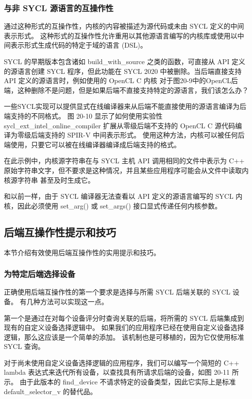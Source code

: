 \subsubsection{与非 SYCL 源语言的互操作性}
通过这种形式的互操作性，内核的内容被描述为源代码或未由 SYCL 定义的中间表示形式。 这种形式的互操作性允许重用以其他源语言编写的内核库或使用以中间表示形式生成代码的特定于域的语言 (DSL)。

SYCL 的早期版本包含诸如 build\_with\_source 之类的函数，可直接从 API 定义的源语言创建 SYCL 程序，但此功能在 SYCL 2020 中被删除。当后端直接支持 API 定义的源语言时，例如使用的 OpenCL C 内核 对于图20-9中的OpenCL后端，这种删除不是问题，但是如果后端不直接支持特定的源语言，我们该怎么办？

一些SYCL实现可以提供显式在线编译器来从后端不能直接使用的源语言编译为后端支持的不同格式。 图 20-10 显示了如何使用实验性 sycl\_ext\_intel\_online\_compiler 扩展从零级后端不支持的 OpenCL C 源代码编译为零级后端支持的 SPIR-V 中间表示形式。 使用这种方法，内核可以被任何后端使用，只要它可以被在线编译器编译成后端支持的格式。

在此示例中，内核源字符串在与 SYCL 主机 API 调用相同的文件中表示为 C++ 原始字符串文字，但不要求是这种情况，并且某些应用程序可能会从文件中读取内核源字符串 甚至及时生成它。

和以前一样，由于 SYCL 编译器无法查看以 API 定义的源语言编写的 SYCL 内核，因此必须使用 set\_arg() 或 set\_args() 接口显式传递任何内核参数。

\subsection{后端互操作性提示和技巧}
本节介绍有效使用后端互操作性的实用提示和技巧。

\subsubsection{为特定后端选择设备}
正确使用后端互操作性的第一个要求是选择与所需 SYCL 后端关联的 SYCL 设备。 有几种方法可以实现这一点。

第一个是通过在对每个设备评分时查询关联的后端，将所需的 SYCL 后端集成到现有的自定义设备选择逻辑中。 如果我们的应用程序已经在使用自定义设备选择逻辑，那么这应该是一个简单的添加。 该机制也是可移植的，因为它仅使用标准 SYCL 查询。

对于尚未使用自定义设备选择逻辑的应用程序，我们可以编写一个简短的 C++ lambda 表达式来迭代所有设备，以查找具有所请求后端的设备，如图 20-11 所示。 由于此版本的 find\_device 不请求特定的设备类型，因此它实际上是标准 default\_selector\_v 的替代品。

